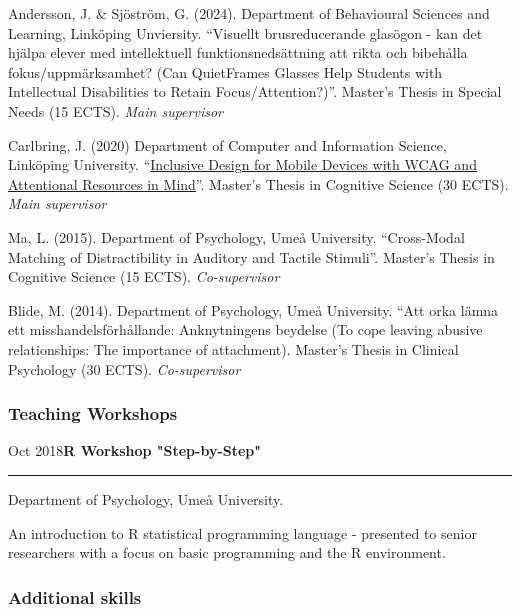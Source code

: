\documentclass[]{article}
\begin{document}
Andersson, J. \& Sjöström, G. (2024). Department of Behavioural Sciences
and Learning, Linköping Unviersity. ``Visuellt brusreducerande glasögon
- kan det hjälpa elever med intellektuell funktionsnedsättning att rikta
och bibehålla fokus/uppmärksamhet? (Can QuietFrames Glasses Help
Students with Intellectual Disabilities to Retain Focus/Attention?)''.
Master's Thesis in Special Needs (15 ECTS). \emph{Main supervisor}

Carlbring, J. (2020) Department of Computer and Information Science,
Linköping University.
``\href{http://liu.diva-portal.org/smash/record.jsf?dswid=-6296&faces-redirect=true&language=en&searchType=SIMPLE&query=Marsja&af=\%5B\%5D&aq=\%5B\%5B\%5D\%5D&aq2=\%5B\%5B\%5D\%5D&aqe=\%5B\%5D&pid=diva2\%3A1441358&noOfRows=50&sortOrder=author_sort_asc&sortOrder2=title_sort_asc&onlyFullText=false&sf=undergraduate}{Inclusive
Design for Mobile Devices with WCAG and Attentional Resources in
Mind}''. Master's Thesis in Cognitive Science (30 ECTS). \emph{Main
supervisor}

Ma, L. (2015). Department of Psychology, Umeå University. ``Cross-Modal
Matching of Distractibility in Auditory and Tactile Stimuli''. Master's
Thesis in Cognitive Science (15 ECTS). \emph{Co-supervisor}

Blide, M. (2014). Department of Psychology, Umeå University. ``Att orka
lämna ett misshandelsförhållande: Anknytningens beydelse (To cope
leaving abusive relationships: The importance of attachment). Master's
Thesis in Clinical Psychology (30 ECTS). \emph{Co-supervisor}

\subsubsection{Teaching Workshops}\label{teaching-workshops}

Oct 2018\hspace{0.75cm}\textbf{R Workshop "Step-by-Step"}\vspace{1mm}

\hrule
\begin{changemargin}{2.15cm}{2.4cm}


Department of Psychology, Umeå University.

An introduction to R statistical programming language - presented to senior researchers with a focus on basic programming and the R environment.

\end{changemargin}

\subsubsection{Additional skills}\label{additional-skills}
\end{document}
